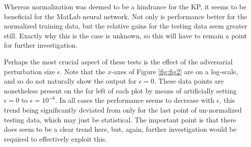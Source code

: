 \documentclass          {article} %
\begin{document}
Whereas normalization was deemed to be a hindrance for the KP, it seems to be beneficial for the MatLab neural network. Not only is performance better for the normalized training data, but the relative gains for the testing data seem greater still. Exactly why this is the case is unknown, so this will have to remain a point for further investigation.

Perhaps the most crucial aspect of these tests is the effect of the adversarial perturbation size $\epsilon$. Note that the $x$-axes of Figure \ref{fig:fig2} are on a log-scale, and so do not naturally show the output for $\epsilon=0$. These data points are nonetheless present on the far left of each plot by means of artificially setting $\epsilon=0$ to $\epsilon=10^{-6}$. In all cases the performance seems to decrease with $\epsilon$, this trend being significantly deviated from only for the last point of un-normalized testing data, which may just be statistical. The important point is that there does seem to be a clear trend here, but, again, further investigation would be required to effectively exploit this.
\end{document}
